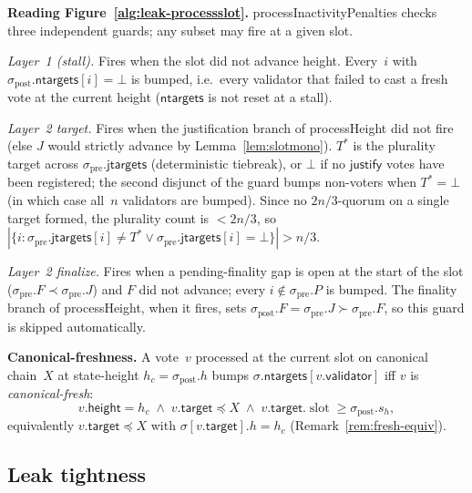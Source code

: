 \documentclass{article}
\newcommand{\slot}[0]{\ensuremath{\operatorname{\mathrm{slot}}}}
\newcommand{\target}{\mathsf{target}}
\newcommand{\height}{\mathsf{height}}
\newcommand{\validator}{\mathsf{validator}}
\newcommand{\just}{\ensuremath{\mathsf{justify}}\xspace}
\newcommand{\jtargets}{\mathsf{jtargets}}
\newcommand{\ntargets}{\mathsf{ntargets}}
\newcommand{\processHeight}{\textsf{processHeight}\xspace}
\newcommand{\processInactivityPenalties}{\textsf{processInactivityPenalties}\xspace}
\renewcommand{\paragraph}[1]{\vspace{7pt}\noindent\textbf{#1}}
\theoremstyle{plain}
\theoremstyle{definition}
\theoremstyle{remark}
\begin{document}
\paragraph{Reading Figure~\ref{alg:leak-processslot}.}
\processInactivityPenalties checks three independent guards; any subset may fire at a given slot.

\emph{Layer~1 (stall).} Fires when the slot did not advance height.
Every~$i$ with $\sigma_{\mathrm{post}}.\ntargets[i] = \bot$ is bumped, i.e.\ every validator that failed to cast a fresh vote at the current height ($\ntargets$ is not reset at a stall).

\emph{Layer~2 target.} Fires when the justification branch of \processHeight did not fire (else $J$ would strictly advance by Lemma~\ref{lem:slotmono}).
$T^*$ is the plurality target across $\sigma_{\mathrm{pre}}.\jtargets$ (deterministic tiebreak), or $\bot$ if no \just votes have been registered; the second disjunct of the guard bumps non-voters when $T^* = \bot$ (in which case all~$n$ validators are bumped).
Since no $2n/3$-quorum on a single target formed, the plurality count is $< 2n/3$, so $|\{i : \sigma_{\mathrm{pre}}.\jtargets[i] \neq T^* \vee \sigma_{\mathrm{pre}}.\jtargets[i] = \bot\}| > n/3$.

\emph{Layer~2 finalize.} Fires when a pending-finality gap is open at the start of the slot ($\sigma_{\mathrm{pre}}.F \prec \sigma_{\mathrm{pre}}.J$) and $F$ did not advance; every $i \notin \sigma_{\mathrm{pre}}.P$ is bumped.
The finality branch of \processHeight, when it fires, sets $\sigma_{\mathrm{post}}.F = \sigma_{\mathrm{pre}}.J \succ \sigma_{\mathrm{pre}}.F$, so this guard is skipped automatically.

\paragraph{Canonical-freshness.}
A vote~$v$ processed at the current slot on canonical chain~$X$ at state-height $h_c = \sigma_{\mathrm{post}}.h$ bumps $\sigma.\ntargets[v.\validator]$ iff $v$ is \emph{canonical-fresh}:
\[
  v.\height = h_c \;\wedge\; v.\target \preceq X \;\wedge\; v.\target.\slot \geq \sigma_{\mathrm{post}}.s_h,
\]
equivalently $v.\target \preceq X$ with $\sigma[v.\target].h = h_c$ (Remark~\ref{rem:fresh-equiv}).

\subsection{Leak tightness}
\end{document}
